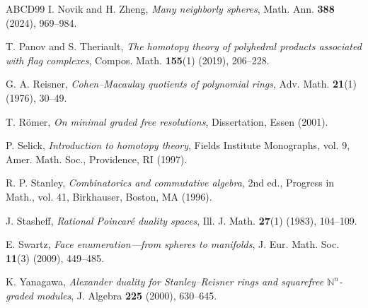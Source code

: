 \documentclass[a4paper,10pt]{amsart}
\theoremstyle{definition}
\theoremstyle{remark}
\begin{document}
\begin{thebibliography}{ABCD99}
 I. Novik and H. Zheng, \emph{Many neighborly spheres}, Math. Ann. \textbf{388} (2024), 969--984.

 T. Panov and S. Theriault, \emph{The homotopy theory of polyhedral products associated with flag complexes}, Compos. Math. \textbf{155}(1) (2019), 206--228.

 G. A. Reisner, \emph{Cohen--Macaulay quotients of polynomial rings}, Adv. Math. \textbf{21}(1) (1976), 30--49.

 T. R\"omer, \emph{On minimal graded free resolutions}, Dissertation, Essen (2001).

 P. Selick, \emph{Introduction to homotopy theory}, Fields Institute Monographs, vol. 9, Amer. Math. Soc., Providence, RI (1997).

 R. P. Stanley, \emph{Combinatorics and commutative algebra}, 2nd ed., Progress in Math., vol. 41, Birkhauser, Boston, MA (1996).

 J. Stasheff, \emph{Rational Poincar\'e duality spaces}, Ill. J. Math. \textbf{27}(1) (1983), 104--109.

 E. Swartz, \emph{Face enumeration---from spheres to manifolds}, J. Eur. Math. Soc. \textbf{11}(3) (2009), 449--485.

 K. Yanagawa, \emph{Alexander duality for Stanley--Reisner rings and squarefree $\mathbb{N}^n$-graded modules}, J. Algebra \textbf{225} (2000), 630--645.

\end{thebibliography}
\end{document}
